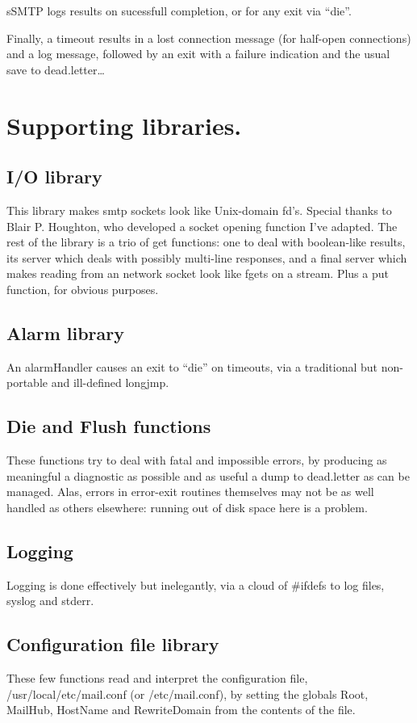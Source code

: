 	sSMTP logs results on sucessfull completion, or for any
exit via ``die''.

  Finally, a timeout results in a lost connection message (for half-open
connections) and a log message, followed by an exit with a failure
indication and the usual save to dead.letter\ldots

\section{Supporting libraries.}
\subsection{I/O library}
	This library makes smtp sockets look like Unix-domain fd's.
Special thanks to Blair P. Houghton, who developed a socket opening
function I've adapted.
	The rest of the library is a trio of get functions: one
to deal with boolean-like results, its server which deals with
possibly multi-line responses, and a final server which makes 
reading from an network socket look like fgets on a stream.
	Plus a put function, for obvious purposes.

\subsection{Alarm library}
	An alarmHandler causes an exit to ``die'' on timeouts,
via a traditional but non-portable and ill-defined longjmp.

\subsection{Die and Flush functions}
	These functions try to deal with fatal and impossible
errors, by producing as meaningful a diagnostic as possible
and as useful a dump to dead.letter as can be managed.  Alas,
errors in error-exit routines themselves may not be as well handled
as others elsewhere: running out of disk space here is a problem.

\subsection{Logging}
	Logging is done effectively but inelegantly, via a cloud
of #ifdefs to log files, syslog and stderr.

\subsection{Configuration file library}
	These few functions read and interpret the configuration file,
/usr/local/etc/mail.conf (or /etc/mail.conf), by setting
the globals Root, MailHub, HostName and RewriteDomain from the contents
of the file.

